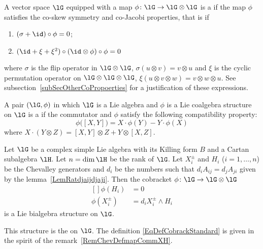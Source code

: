\begin{definition}
	A vector space \( \lG\) equipped with a map \( \phi\colon \lG\to \lG\otimes\lG\) is a \cite{Farnsteiner} if the map \( \phi\) satisfies the co-skew symmetry and co-Jacobi properties, that is if
	\begin{enumerate}
		\item
		      $(\sigma+\id)\circ\phi=0$;
		\item
		      $(\id+\xi+\xi^2)\circ(\id\otimes\phi)\circ\phi=0$
	\end{enumerate}
	where \( \sigma\) is the flip operator in \( \lG\otimes\lG\), \( \sigma(u\otimes v)=v\otimes u\) and \( \xi\) is the cyclic permutation operator on \( \lG\otimes\lG\otimes\lG\), \( \xi(u\otimes v\otimes w)=v\otimes w\otimes u\). See subsection~\ref{subSecOtherCoPropoerties} for a justification of these expressions.
\end{definition}

\begin{definition}
	A pair \( (\lG,\phi)\) in which \( \lG\) is a Lie algebra and \( \phi\) is a Lie coalgebra structure on \( \lG\) is a  if the commutator and \( \phi\) satisfy the following compatibility property:
	\begin{equation}
		\phi\big( [X,Y] \big)=X\cdot\phi(Y)-Y\cdot\phi(X)
	\end{equation}
	where $X\cdot(Y\otimes Z)=[X,Y]\otimes Z+Y\otimes[X,Z]$.
\end{definition}

\begin{proposition}     \label{PropStandardBialgStruct}
	Let \( \lG\) be a complex simple Lie algebra with its Killing form \( B\) and a Cartan subalgebra \( \lH\). Let \( n=\dim\lH\) be the rank of \( \lG\). Let \( X_i^{\pm}\) and \( H_i\) (\( i=1,\ldots,n\)) be the Chevalley generators and \( d_i\) be the numbers such that \( d_iA_{ij}=d_jA_{ji}\) given by the lemma~\ref{LemRatdjaijdjaji}. Then the cobracket \( \phi\colon \lG\to \lG\otimes\lG\)
	\begin{equation}        \label{EqDefCobrackStandard}
		\begin{aligned}[]
			\phi(H_i)       & =0                      \\
			\phi(X_i^{\pm}) & =d_iX_i^{\pm}\wedge H_i
		\end{aligned}
	\end{equation}
	is a Lie bialgebra structure on \( \lG\).
\end{proposition}
This structure is the  on \( \lG\). The definition \eqref{EqDefCobrackStandard} is given in the spirit of the remark~\ref{RemChevDefmapCommXH}.

